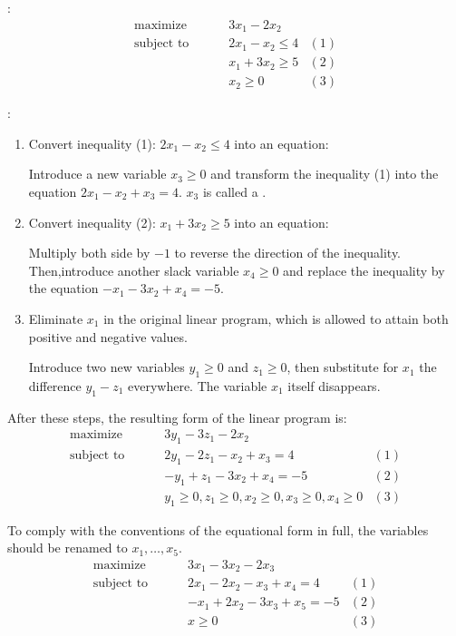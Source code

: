     \par {}:
    \begin{align*}
      \text{maximize } \qquad
        & 3x_1 - 2x_2
      & \\
      \text{subject to } \qquad
        & 2x_1 - x_2 \leq 4 & (1) \\
        & x_1 + 3x_2 \geq 5 & (2) \\
        & x_2 \geq 0        & (3)
    \end{align*}
    \par {}:
      \begin{enumerate}[1)]
        \item Convert inequality (1): $2x_1 - x_2 \leq 4$ into an equation:
          \par Introduce a new variable $x_3 \geq 0$ and transform the inequality (1) into the equation $2x_1 - x_2 + x_3 = 4$. $x_3$ is called a .
        \item Convert inequality (2): $x_1 + 3x_2 \geq 5$ into an equation:
          \par Multiply both side by $-1$ to reverse the direction of the inequality. Then,introduce another slack variable $x_4 \geq 0$ and replace the inequality by the equation $−x_1 − 3x_2 + x_4 = −5$.
        \item Eliminate $x_1$ in the original linear program, which is allowed to attain both positive and negative values.
          \par Introduce two new variables $y_1 \geq 0$ and $z_1 \geq 0$, then substitute for $x_1$ the difference $y_1 − z_1$ everywhere. The variable $x_1$ itself disappears.
      \end{enumerate}
    \par After these steps, the resulting form of the linear program is:
    \begin{align*}
      \text{maximize } \qquad
        & 3y_1 - 3z_1 - 2x_2
      & \\
      \text{subject to } \qquad
        & 2y_1 - 2z_1 - x_2 + x_3 = 4 & (1) \\
        & -y_1 + z_1 - 3x_2 + x_4 = -5 & (2) \\
        & y_1 \geq 0, z_1 \geq 0, x_2 \geq 0, x_3 \geq 0, x_4 \geq 0& (3)
    \end{align*}
    \par To comply with the conventions of the equational form in full, the variables should be renamed to $x_1, \ldots, x_5$.
    \begin{align*}
      \text{maximize } \qquad
        & 3x_1 - 3x_2 - 2x_3
      & \\
      \text{subject to } \qquad
        & 2x_1 - 2x_2 - x_3 + x_4 = 4 & (1) \\
        & -x_1 + 2x_2 - 3x_3 + x_5 = -5 & (2) \\
        & x \geq 0 & (3)
    \end{align*}

